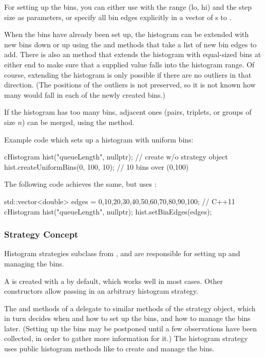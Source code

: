 For setting up the bins, you can either use 
with the range (lo, hi) and the step size as parameters, or specify
all bin edges explicitly in a vector of s to .

When the bins have already been set up, the histogram can be extended
with new bins down or up using the  and 
methods that take a list of new bin edges to add. There is also an
 method that extends the histogram with equal-sized
bins at either end to make sure that a supplied value falls into the
histogram range. Of course, extending the histogram is only possible
if there are no outliers in that direction. (The positions of the
outliers is not preserved, so it is not known how many would fall in
each of the newly created bins.)

If the histogram has too many bins, adjacent ones (pairs, triplets,
or groups of size $n$) can be merged, using the 
method.

Example code which sets up a histogram with uniform bins:

\begin{cpp}
cHistogram hist("queueLength", nullptr); // create w/o strategy object
hist.createUniformBins(0, 100, 10); // 10 bins over (0,100)
\end{cpp}

The following code achieves the same, but uses :

\begin{cpp}
std::vector<double> edges = {0,10,20,30,40,50,60,70,80,90,100}; // C++11
cHistogram hist("queueLength", nullptr);
hist.setBinEdges(edges);
\end{cpp}


\subsubsection{Strategy Concept}
\label{sec:sim-lib:histogram-strategy-concept}

Histogram strategies subclass from , and are
responsible for setting up and managing the bins.

A  is created with a 
by default, which works well in most cases. Other 
constructors allow passing in an arbitrary histogram strategy.

The  and  methods of a
 delegate to similar methods of the strategy
object, which in turn decides when and how to set up the bins,
and how to manage the bins later. (Setting up the bins may be
postponed until a few observations have been collected, in order to
gather more information for it.) The histogram strategy
uses public histogram methods like 
to create and manage the bins.

